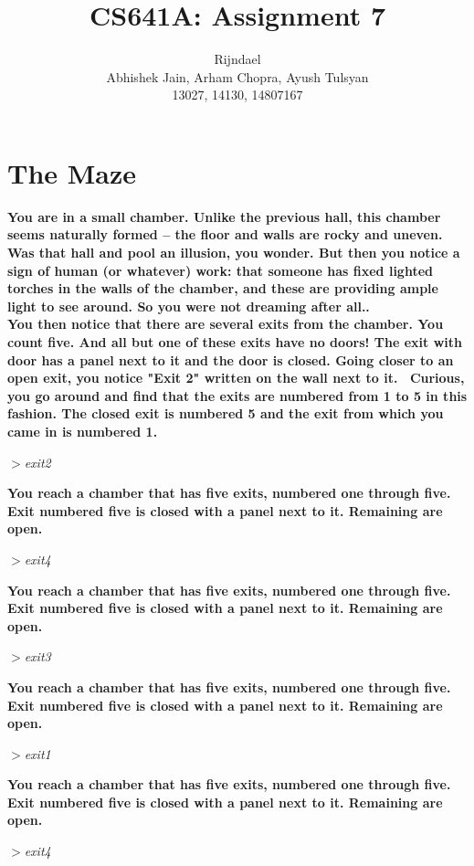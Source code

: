\documentclass[11pt]{article}
\title{CS641A: Assignment 7}
\author{Rijndael \\Abhishek Jain, Arham Chopra, Ayush Tulsyan \\ 13027, 14130, 14807167}
\date{}
\begin{document}
\maketitle
\section{The Maze}
\begin{justify}
\textbf{You are in a small chamber. Unlike the previous hall, this chamber seems naturally formed -- the floor and walls are rocky and uneven. Was that hall and pool an illusion, you wonder. But then you notice a sign of human (or whatever) work: that someone has fixed lighted torches in the walls of the chamber, and these are providing ample light to see around. So you were not dreaming after all..\\
You then notice that there are several exits from the chamber. You count five. And all but one of these exits have no doors! The exit with door has a panel next to it and the door is closed. Going closer to an open exit, you notice "Exit 2" written on the wall next to it.  Curious, you go around and find that the exits are numbered from 1 to 5 in this fashion. The closed exit is numbered 5 and the exit from which you came in is numbered 1.}
\end{justify}
$>$\textit{exit2}


\begin{justify}
\textbf{You reach a chamber that has five exits, numbered one through five. Exit numbered five is closed with a panel next to it. Remaining are open.
}
\end{justify}
$>$\textit{exit4}



\begin{justify}
	\textbf{You reach a chamber that has five exits, numbered one through five. Exit numbered five is closed with a panel next to it. Remaining are open.
	}
\end{justify}
$>$\textit{exit3}


\begin{justify}
	\textbf{You reach a chamber that has five exits, numbered one through five. Exit numbered five is closed with a panel next to it. Remaining are open.
	}
\end{justify}
$>$\textit{exit1}


\begin{justify}
	\textbf{You reach a chamber that has five exits, numbered one through five. Exit numbered five is closed with a panel next to it. Remaining are open.
	}
\end{justify}
$>$\textit{exit4}
\end{document}

